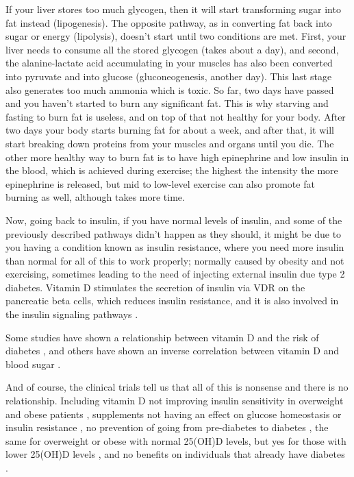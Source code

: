 If your liver stores too much glycogen, then it will start transforming sugar into fat instead (lipogenesis). The opposite pathway, as in converting fat back into sugar or energy (lipolysis), doesn't start until two conditions are met. First, your liver needs to consume all the stored glycogen (takes about a day), and second, the alanine-lactate acid accumulating in your muscles has also been converted into pyruvate and into glucose (gluconeogenesis, another day). This last stage also generates too much ammonia which is toxic. So far, two days have passed and you haven't started to burn any significant fat. This is why starving and fasting to burn fat is useless, and on top of that not healthy for your body. After two days your body starts burning fat for about a week, and after that, it will start breaking down proteins from your muscles and organs until you die. The other more healthy way to burn fat is to have high epinephrine and low insulin in the blood, which is achieved during exercise; the highest the intensity the more epinephrine is released, but mid to low-level exercise can also promote fat burning as well, although takes more time.

Now, going back to insulin, if you have normal levels of insulin, and some of the previously described pathways didn't happen as they should, it might be due to you having a condition known as insulin resistance, where you need more insulin than normal for all of this to work properly; normally caused by obesity and not exercising, sometimes leading to the need of injecting external insulin due type 2 diabetes. Vitamin D stimulates the secretion of insulin via VDR on the pancreatic beta cells, which reduces insulin resistance, and it is also involved in the insulin signaling pathways \cite{ref:Pittas2019, ref:Mousa2018, ref:Li2018}.

Some studies have shown a relationship between vitamin D and the risk of diabetes \cite{ref:1_Institute_of_Medicine2011-zg}, and others have shown an inverse correlation between vitamin D and blood sugar \cite{ref:Rafiq2018}.

And of course, the clinical trials tell us that all of this is nonsense and there is no relationship. Including vitamin D not improving insulin sensitivity in overweight and obese patients \cite{ref:Mousa2017}, supplements not having an effect on glucose homeostasis or insulin resistance \cite{ref:Seida2014, ref:Bouillon2021}, no prevention of going from pre-diabetes to diabetes \cite{ref:Jorde2016}, the same for overweight or obese with normal 25(OH)D levels, but yes for those with lower 25(OH)D levels \cite{ref:vitD2019, ref:Pittas2019}, and no benefits on individuals that already have diabetes \cite{ref:Li2018}.


